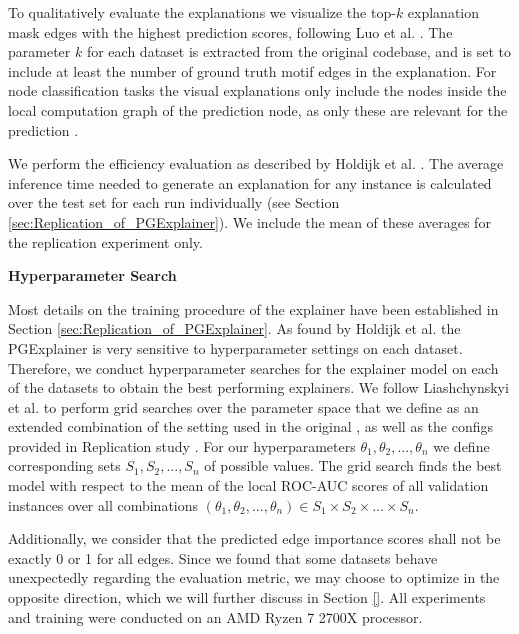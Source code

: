 To qualitatively evaluate the explanations we visualize the top-$k$ explanation mask edges with the highest prediction scores, following Luo et al. \cite{luo2020parameterized}. The parameter $k$ for each dataset is extracted from the original codebase, and is set to include at least the number of ground truth motif edges in the explanation. For node classification tasks the visual explanations only include the nodes inside the local computation graph of the prediction node, as only these are relevant for the prediction \cite{ying2019gnnexplainer}.

We perform the efficiency evaluation as described by Holdijk et al. \cite{holdijk2021re}. The average inference time needed to generate an explanation for any instance is calculated over the test set for each run individually (see Section \ref{sec:Replication_of_PGExplainer}). We include the mean of these averages for the replication experiment only. \bigskip

\textbf{Hyperparameter Search}\par
Most details on the training procedure of the explainer have been established in Section \ref{sec:Replication_of_PGExplainer}. As found by Holdijk et al. \cite{holdijk2021re} the PGExplainer is very sensitive to hyperparameter settings on each dataset. Therefore, we conduct hyperparameter searches for the explainer model on each of the datasets to obtain the best performing explainers. We follow Liashchynskyi et al. \cite{liashchynskyi2019grid} to perform grid searches over the parameter space that we define as an extended combination of the setting used in the original \cite{luo2020parameterized}, as well as the configs provided in Replication study \cite{holdijk2021re}. For our hyperparameters $\theta_1,\theta_2,...,\theta_n$ we define corresponding sets $S_1,S_2,...,S_n$ of possible values. The grid search finds the best model with respect to the mean of the local ROC-AUC scores of all validation instances over all combinations $(\theta_1,\theta_2,...,\theta_n) \in S_1\times S_2 \times...\times S_n$. 

Additionally, we consider that the predicted edge importance scores shall not be exactly 0 or 1 for all edges. Since we found that some datasets behave unexpectedly regarding the evaluation metric, we may choose to optimize in the opposite direction, which we will further discuss in Section \ref{}. All experiments and training were conducted on an AMD Ryzen 7 2700X processor.

